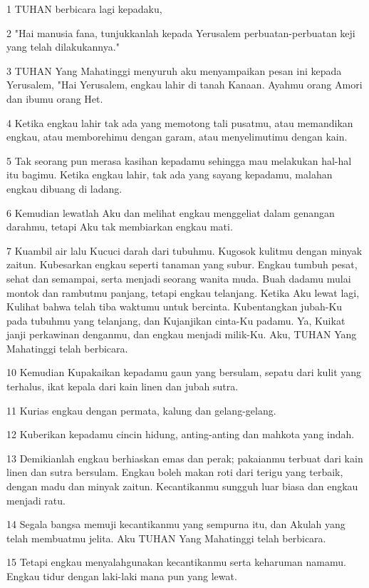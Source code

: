 \par 1 TUHAN berbicara lagi kepadaku,
\par 2 "Hai manusia fana, tunjukkanlah kepada Yerusalem perbuatan-perbuatan keji yang telah dilakukannya."
\par 3 TUHAN Yang Mahatinggi menyuruh aku menyampaikan pesan ini kepada Yerusalem, "Hai Yerusalem, engkau lahir di tanah Kanaan. Ayahmu orang Amori dan ibumu orang Het.
\par 4 Ketika engkau lahir tak ada yang memotong tali pusatmu, atau memandikan engkau, atau memborehimu dengan garam, atau menyelimutimu dengan kain.
\par 5 Tak seorang pun merasa kasihan kepadamu sehingga mau melakukan hal-hal itu bagimu. Ketika engkau lahir, tak ada yang sayang kepadamu, malahan engkau dibuang di ladang.
\par 6 Kemudian lewatlah Aku dan melihat engkau menggeliat dalam genangan darahmu, tetapi Aku tak membiarkan engkau mati.
\par 7 Kuambil air lalu Kucuci darah dari tubuhmu. Kugosok kulitmu dengan minyak zaitun. Kubesarkan engkau seperti tanaman yang subur. Engkau tumbuh pesat, sehat dan semampai, serta menjadi seorang wanita muda. Buah dadamu mulai montok dan rambutmu panjang, tetapi engkau telanjang. Ketika Aku lewat lagi, Kulihat bahwa telah tiba waktumu untuk bercinta. Kubentangkan jubah-Ku pada tubuhmu yang telanjang, dan Kujanjikan cinta-Ku padamu. Ya, Kuikat janji perkawinan denganmu, dan engkau menjadi milik-Ku. Aku, TUHAN Yang Mahatinggi telah berbicara.
\par 10 Kemudian Kupakaikan kepadamu gaun yang bersulam, sepatu dari kulit yang terhalus, ikat kepala dari kain linen dan jubah sutra.
\par 11 Kurias engkau dengan permata, kalung dan gelang-gelang.
\par 12 Kuberikan kepadamu cincin hidung, anting-anting dan mahkota yang indah.
\par 13 Demikianlah engkau berhiaskan emas dan perak; pakaianmu terbuat dari kain linen dan sutra bersulam. Engkau boleh makan roti dari terigu yang terbaik, dengan madu dan minyak zaitun. Kecantikanmu sungguh luar biasa dan engkau menjadi ratu.
\par 14 Segala bangsa memuji kecantikanmu yang sempurna itu, dan Akulah yang telah membuatmu jelita. Aku TUHAN Yang Mahatinggi telah berbicara.
\par 15 Tetapi engkau menyalahgunakan kecantikanmu serta keharuman namamu. Engkau tidur dengan laki-laki mana pun yang lewat.
